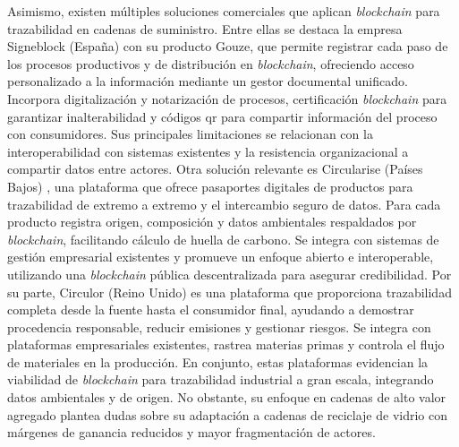 Asimismo, existen múltiples soluciones comerciales que aplican \textit{blockchain} para trazabilidad en cadenas de suministro. Entre ellas se destaca la empresa Signeblock (España) \cite{signeblock2024} con su producto Gouze, que permite registrar cada paso de los procesos productivos y de distribución en \textit{blockchain}, ofreciendo acceso personalizado a la información mediante un gestor documental unificado. Incorpora digitalización y notarización de procesos, certificación \textit{blockchain} para garantizar inalterabilidad y códigos \gls{qr} para compartir información del proceso con consumidores. Sus principales limitaciones se relacionan con la interoperabilidad con sistemas existentes y la resistencia organizacional a compartir datos entre actores. Otra solución relevante es Circularise (Países Bajos) \cite{circularise2024}, una plataforma que ofrece pasaportes digitales de productos para trazabilidad de extremo a extremo y el intercambio seguro de datos. Para cada producto registra origen, composición y datos ambientales respaldados por \textit{blockchain}, facilitando cálculo de huella de carbono. Se integra con sistemas de gestión empresarial existentes y promueve un enfoque abierto e interoperable, utilizando una \textit{blockchain} pública descentralizada para asegurar credibilidad. Por su parte, Circulor (Reino Unido) \cite{circulor2024} es una plataforma que proporciona trazabilidad completa desde la fuente hasta el consumidor final, ayudando a demostrar procedencia responsable, reducir emisiones y gestionar riesgos. Se integra con plataformas empresariales existentes, rastrea materias primas y controla el flujo de materiales en la producción. En conjunto, estas plataformas evidencian la viabilidad de \textit{blockchain} para trazabilidad industrial a gran escala, integrando datos ambientales y de origen. No obstante, su enfoque en cadenas de alto valor agregado plantea dudas sobre su adaptación a cadenas de reciclaje de vidrio con márgenes de ganancia reducidos y mayor fragmentación de actores.

